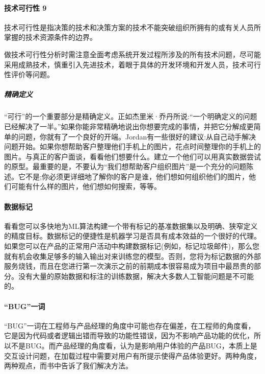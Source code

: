 \documentclass[letterpaper,10pt,english]{sphinxmanual}
\begin{document}
\paragraph{技术可行性 9\sphinxfootnotemark[448]}
\label{\detokenize{chapter_idea/understand_tech:id39}}%
\begin{footnotetext}[448]\sphinxAtStartFootnote
{}
%
\end{footnotetext}\ignorespaces 
技术可行性是指决策的技术和决策方案的技术不能突破组织所拥有的或有关人员所掌握的技术资源条件的边界。

做技术可行性分析时需注意全面考虑系统开发过程所涉及的所有技术问题，尽可能采用成熟技术，慎重引入先进技术，着眼于具体的开发环境和开发人员，技术可行性评价等问题。


\subparagraph{精确定义}
\label{\detokenize{chapter_idea/understand_tech:id40}}
“可行”的一个重要部分是精确定义。正如杰里米·乔丹所说:“一个明确定义的问题已经解决了一半。”如果你能非常精确地说出你想要完成的事情，并把它分解成更简单的问题，你就有了一个良好的开端。Jordan有一些很好的建议:从自己动手解决问题开始。如果你想帮助客户整理他们手机上的图片，花点时间整理你的手机上的图片。与真正的客户面谈，看看他们想要什么。建立一个他们可以用真实数据尝试的原型。最重要的是，不要认为“我们想帮助客户组织图片”是一个充分的问题陈述。它不是;你必须更详细地了解你的客户是谁，他们想如何组织他们的图片，他们可能有什么样的图片，他们想如何搜索，等等。


\paragraph{数据标记}
\label{\detokenize{chapter_idea/understand_tech:id41}}
看看您可以多快地为ML算法构建一个带有标记的基准数据集以及明确、狭窄定义的精度目标。数据标记的便捷性是机器学习是否具有成本效益的一个很好的代理。如果您可以在产品的正常用户活动中构建数据标记(例如，标记垃圾邮件)，那么您就有机会收集足够多的输入\sphinxhyphen{}输出对来训练您的模型。否则，您将为标记数据的外部服务烧钱，而且在您进行第一次演示之前的前期成本很容易成为项目中最昂贵的部分。没有大量的原始数据和标注的训练数据，解决大多数人工智能问题是不可能的。


\paragraph{“BUG”一词}
\label{\detokenize{chapter_idea/understand_tech:bug}}
“BUG”一词在工程师与产品经理的角度中可能也存在偏差，在工程师的角度看，它是因为代码或者逻辑出错而导致的功能性错误，因为不影响产品功能的优化，所以不是BUG。而产品经理的角度看，认为是影响用户体验的产品BUG，本质上是交互设计问题，在加载过程中需要对用户有所提示使得产品体验更好。两种角度，两种观点，而书中告诉了我们解决方法。
\end{document}
